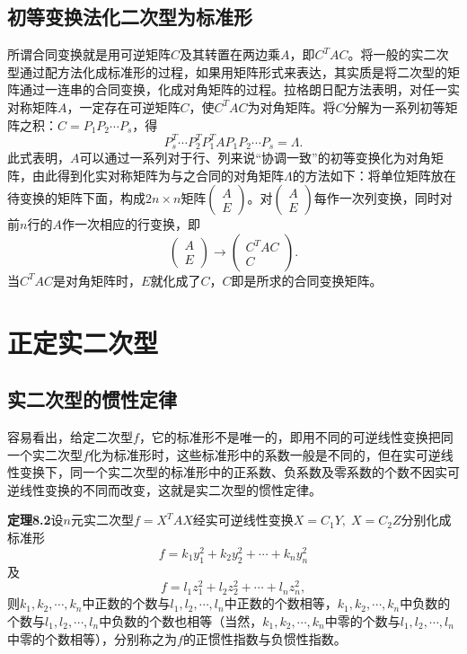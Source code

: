 \subsection{初等变换法化二次型为标准形}
所谓合同变换就是用可逆矩阵$C$及其转置在两边乘$A$，即$C^TAC$。将一般的实二次型通过配方法化成标准形的过程，如果用矩阵形式来表达，其实质是将二次型的矩阵通过一连串的合同变换，化成对角矩阵的过程。拉格朗日配方法表明，对任一实对称矩阵$A$，一定存在可逆矩阵$C$，使$C^TAC$为对角矩阵。将$C$分解为一系列初等矩阵之积：$C=P_1P_2\cdots P_s$，得
\[
P_s^T\cdots P_2^T P_1^T A P_1 P_2\cdots P_s=\Lambda.
\]
此式表明，$A$可以通过一系列对于行、列来说“协调一致”的初等变换化为对角矩阵，由此得到化实对称矩阵为与之合同的对角矩阵$\Lambda$的方法如下：将单位矩阵放在待变换的矩阵下面，构成$2n\times n$矩阵$\begin{pmatrix}A\\E\end{pmatrix}$。对$\begin{pmatrix}A\\E\end{pmatrix}$每作一次列变换，同时对前$n$行的$A$作一次相应的行变换，即
\[
\begin{pmatrix}A\\E\end{pmatrix}\rightarrow\begin{pmatrix}C^TAC\\C\end{pmatrix}.
\]
当$C^TAC$是对角矩阵时，$E$就化成了$C$，$C$即是所求的合同变换矩阵。

\section{正定实二次型}
\subsection{实二次型的惯性定律}
容易看出，给定二次型$f$，它的标准形不是唯一的，即用不同的可逆线性变换把同一个实二次型$f$化为标准形时，这些标准形中的系数一般是不同的，但在实可逆线性变换下，同一个实二次型的标准形中的正系数、负系数及零系数的个数不因实可逆线性变换的不同而改变，这就是实二次型的惯性定律。

\textbf{定理8.2}\quad 设$n$元实二次型$f=X^TAX$经实可逆线性变换$X=C_1Y,\;X=C_2Z$分别化成标准形
\[
f=k_1y_1^2+k_2y_2^2+\cdots +k_ny_n^2
\]
及
\[
f=l_1z_1^2+l_2z_2^2+\cdots+l_nz_n^2,
\]
则$k_1,k_2,\cdots,k_n$中正数的个数与$l_1,l_2,\cdots,l_n$中正数的个数相等，$k_1,k_2,\cdots,k_n$中负数的个数与$l_1,l_2,\cdots,l_n$中负数的个数也相等（当然，$k_1,k_2,\cdots,k_n$中零的个数与$l_1,l_2,\cdots,l_n$中零的个数相等），分别称之为$f$的正惯性指数与负惯性指数。

